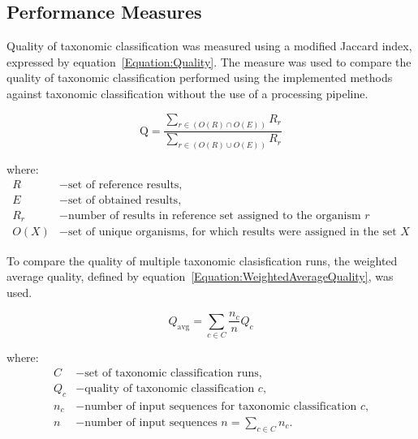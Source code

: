 \documentclass[pdflatex,sn-vancouver-num]{sn-jnl}%
\begin{document}
        \subsection{Performance Measures}
            Quality of taxonomic classification was measured using a modified Jaccard index, expressed by equation~\ref{Equation:Quality}. The measure was used to compare the quality of taxonomic classification performed using the implemented methods against taxonomic classification without the use of a processing pipeline.

            \begin{equation}
                \text{Q} = \frac{
                    \sum_{r \in (O(R) \cap O(E))} R_{r}
                }{
                    \sum_{r \in (O(R) \cup O(E))} R_{r}
                }
                \label{Equation:Quality}
            \end{equation}

            where:
            \begin{align*}
                R &- \text{set of reference results,} \\
                E &- \text{set of obtained results,} \\
                R_{r} &- \text{number of results in reference set assigned to the organism $r$} \\
                O(X) &- \text{set of unique organisms, for which results were assigned in the set $X$}
            \end{align*}

            To compare the quality of multiple taxonomic clasisfication runs, the weighted average quality, defined by equation~\ref{Equation:WeightedAverageQuality}, was used.
            
            \begin{equation}
                Q_{\text{avg}} = \sum_{c \in C} \frac{n_c}{n} Q_c
                \label{Equation:WeightedAverageQuality}
            \end{equation}

            where:
            \begin{align*}
            C &- \text{set of taxonomic classification runs,} \\
            Q_c &- \text{quality of taxonomic classification $c$,} \\
            n_c &- \text{number of input sequences for taxonomic classification $c$,}\\
            n   &- \text{number of input sequences $n = \sum_{c \in C} n_{c}.$}
            \end{align*}
\end{document}

